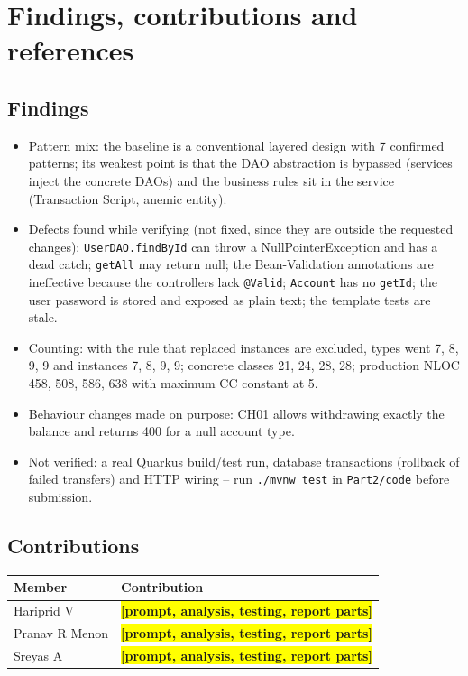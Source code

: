 \documentclass[11pt,a4paper]{article}
\newcommand{\ph}[1]{\colorbox{yellow}{\textbf{[#1]}}}
\begin{document}
\section{Findings, contributions and references}
\subsection{Findings}
\begin{itemize}\item Pattern mix: the baseline is a conventional layered design with 7 confirmed patterns; its weakest point is that the DAO abstraction is bypassed (services inject the concrete DAOs) and the business rules sit in the service (Transaction Script, anemic entity).\end{itemize}
\begin{itemize}\item Defects found while verifying (not fixed, since they are outside the requested changes): \texttt{UserDAO.\allowbreak{}findById} can throw a NullPointerException and has a dead catch; \texttt{getAll} may return null; the Bean-Validation annotations are ineffective because the controllers lack \texttt{@Valid}; \texttt{Account} has no \texttt{getId}; the user password is stored and exposed as plain text; the template tests are stale.\end{itemize}
\begin{itemize}\item Counting: with the rule that replaced instances are excluded, types went 7, 8, 9, 9 and instances 7, 8, 9, 9; concrete classes 21, 24, 28, 28; production NLOC 458, 508, 586, 638 with maximum CC constant at 5.\end{itemize}
\begin{itemize}\item Behaviour changes made on purpose: CH01 allows withdrawing exactly the balance and returns 400 for a null account type.\end{itemize}
\begin{itemize}\item Not verified: a real Quarkus build/test run, database transactions (rollback of failed transfers) and HTTP wiring -- run \texttt{.\allowbreak{}/\allowbreak{}mvnw test} in \texttt{Part2/\allowbreak{}code} before submission.\end{itemize}
\subsection{Contributions}
{\small
\begin{center}\begin{tabular}{@{}p{4cm}p{11.6cm}@{}}
\toprule \textbf{Member} & \textbf{Contribution} \\ \midrule
Hariprid V & \ph{prompt, analysis, testing, report parts} \\
Pranav R Menon & \ph{prompt, analysis, testing, report parts} \\
Sreyas A & \ph{prompt, analysis, testing, report parts} \\
\bottomrule\end{tabular}\end{center}
}
\end{document}
